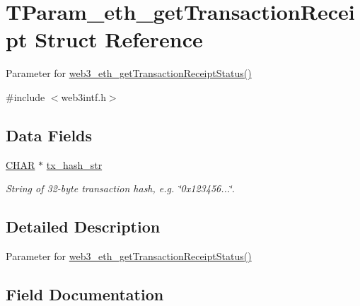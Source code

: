 \hypertarget{struct_t_param__eth__get_transaction_receipt}{}\section{T\+Param\+\_\+eth\+\_\+get\+Transaction\+Receipt Struct Reference}
\label{struct_t_param__eth__get_transaction_receipt}


Parameter for \mbox{\hyperlink{web3intf_8c_a114d1baf518f248dfad3d64ccca67f81}{web3\+\_\+eth\+\_\+get\+Transaction\+Receipt\+Status()}}  




{\ttfamily \#include $<$web3intf.\+h$>$}

\subsection*{Data Fields}
\begin{DoxyCompactItemize}
\item 
\mbox{\hyperlink{boattypes_8h_aebb9e13210d88d43e32e735ada43a425}{C\+H\+AR}} $\ast$ \mbox{\hyperlink{struct_t_param__eth__get_transaction_receipt_a4361c159fbbfe0643849bb4e01ad1e26}{tx\+\_\+hash\+\_\+str}}
\begin{DoxyCompactList}\small\item\em String of 32-\/byte transaction hash, e.\+g. \char`\"{}0x123456...\char`\"{}. \end{DoxyCompactList}\end{DoxyCompactItemize}


\subsection{Detailed Description}
Parameter for \mbox{\hyperlink{web3intf_8c_a114d1baf518f248dfad3d64ccca67f81}{web3\+\_\+eth\+\_\+get\+Transaction\+Receipt\+Status()}} 

\subsection{Field Documentation}
\mbox{\label{struct_t_param__eth__get_transaction_receipt_a4361c159fbbfe0643849bb4e01ad1e26}} 
